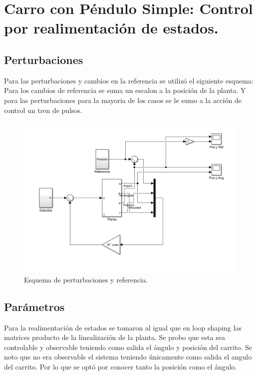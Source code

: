 \section{Carro con Péndulo Simple: Control por realimentaci\'on de estados.}
\subsection{Perturbaciones}
Para las perturbaciones y cambios en la referencia se utiliz\'o el siguiente esquema:
Para los cambios de referencia se suma un escalon a la posici\'on de la planta. Y para las perturbaciones para la mayoria de los casos se le sumo a la acci\'on de control un tren de pulsos.
\begin{figure}[H]
	\centering
	\includegraphics[width=1\linewidth]{Imagenes/Esquema_general.png}
	\caption{Esquema de perturbaciones y referencia.}
	\label{esq}
\end{figure}

\subsection{Par\'ametros}
 Para la realimentación de estados se tomaron al igual que en loop shaping las matrices producto de la linealizaci\'on de la planta.
 Se probo que esta sea controlable y observable teniendo como salida el \'angulo y posici\'on del carrito.
 Se noto que no era observable el sistema teniendo únicamente como salida el angulo del carrito. Por lo que se opt\'o por conocer tanto la posici\'on como el \'angulo.
 
